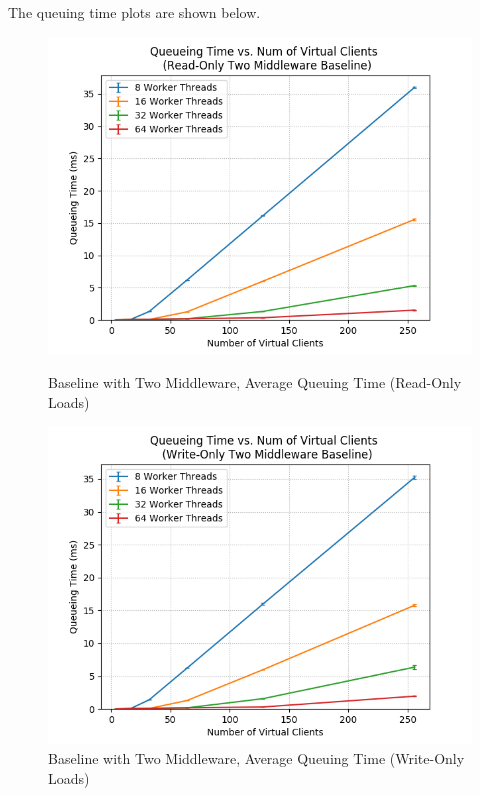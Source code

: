 \documentclass[11pt,a4paper]{article}
\begin{document}
The queuing time plots are shown below.
\begin{figure}[H]
	\captionsetup{font=scriptsize,labelfont=scriptsize,justification=centering}
	\centering
	\begin{minipage}{0.5\textwidth}
		\centering
		\includegraphics[scale=0.525]{images/3b_two-mw_r-o_wt.png}
		\caption{{Baseline with Two Middleware, Average Queuing Time (Read-Only Loads)}}
	\end{minipage}\hfill
	\begin{minipage}{0.5\textwidth}
		\centering
		\includegraphics[scale=0.525]{images/3b_two-mw_w-o_wt.png}
		\caption{{Baseline with Two Middleware, Average Queuing Time (Write-Only Loads)}}
	\end{minipage}
\end{figure}
\end{document}
